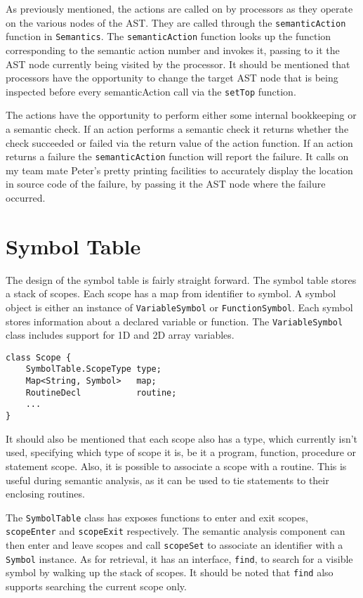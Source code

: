 \documentclass[oneside]{amsart}
\theoremstyle{definition}
\theoremstyle{remark}
\numberwithin{equation}{section}
\begin{document}
As previously mentioned, the actions are called on by processors as they operate
on the various nodes of the AST. They are called through the
\texttt{semanticAction} function in \texttt{Semantics}. The
\texttt{semanticAction} function looks up the function corresponding to the
semantic action number and invokes it, passing to it the AST node currently
being visited by the processor. It should be mentioned that processors have the
opportunity to change the target AST node that is being inspected before every
semanticAction call via the \texttt{setTop} function.

The actions have the opportunity to perform either some internal bookkeeping or
a semantic check. If an action performs a semantic check it returns whether the
check succeeded or failed via the return value of the action function. If an
action returns a failure the \texttt{semanticAction} function will report the
failure. It calls on my team mate Peter's pretty printing facilities to
accurately display the location in source code of the failure, by passing it the
AST node where the failure occurred.

\section{Symbol Table}
The design of the symbol table is fairly straight forward. The symbol table
stores a stack of scopes. Each scope has a map from identifier to symbol. A
symbol object is either an instance of \texttt{VariableSymbol} or
\texttt{FunctionSymbol}. Each symbol stores information about a declared
variable or function. The \texttt{VariableSymbol} class includes support for
1D and 2D array variables.

\begin{lstlisting}
class Scope {
    SymbolTable.ScopeType type;
    Map<String, Symbol>   map;
    RoutineDecl           routine;
    ...
}
\end{lstlisting}

It should also be mentioned that each scope also has a type, which currently
isn't used, specifying which type of scope it is, be it a program, function,
procedure or statement scope. Also, it is possible to associate a scope with
a routine. This is useful during semantic analysis, as it can be used to tie
statements to their enclosing routines.

The \texttt{SymbolTable} class has exposes functions to enter and exit scopes,
\texttt{scopeEnter} and \texttt{scopeExit} respectively. The semantic analysis
component can then enter and leave scopes and call \texttt{scopeSet} to
associate an identifier with a \texttt{Symbol} instance. As for retrieval, it
has an interface, \texttt{find}, to search for a visible symbol by walking up
the stack of scopes. It should be noted that \texttt{find} also supports
searching the current scope only.

\end{document}
